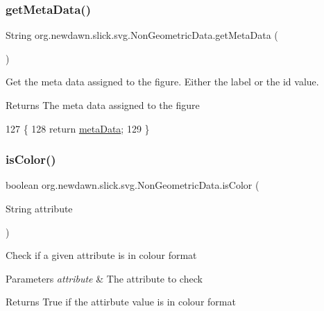 \subsubsection{\texorpdfstring{get\+Meta\+Data()}{getMetaData()}}
{\footnotesize\ttfamily String org.\+newdawn.\+slick.\+svg.\+Non\+Geometric\+Data.\+get\+Meta\+Data (\begin{DoxyParamCaption}{ }\end{DoxyParamCaption})\hspace{0.3cm}{\ttfamily [inline]}}

Get the meta data assigned to the figure. Either the label or the id value.

\begin{DoxyReturn}{Returns}
The meta data assigned to the figure 
\end{DoxyReturn}

\begin{DoxyCode}
127                                 \{
128         \textcolor{keywordflow}{return} \mbox{\hyperlink{classorg_1_1newdawn_1_1slick_1_1svg_1_1_non_geometric_data_ab9720408fbd609767acb6528999a3f8d}{metaData}};
129     \}
\end{DoxyCode}
\mbox{\label{classorg_1_1newdawn_1_1slick_1_1svg_1_1_non_geometric_data_a3712fb62547b297f7d08259682fc2d90}} 
\subsubsection{\texorpdfstring{is\+Color()}{isColor()}}
{\footnotesize\ttfamily boolean org.\+newdawn.\+slick.\+svg.\+Non\+Geometric\+Data.\+is\+Color (\begin{DoxyParamCaption}\item[{String}]{attribute }\end{DoxyParamCaption})\hspace{0.3cm}{\ttfamily [inline]}}

Check if a given attribute is in colour format


\begin{DoxyParams}{Parameters}
{\em attribute} & The attribute to check \\
\hline
\end{DoxyParams}
\begin{DoxyReturn}{Returns}
True if the attirbute value is in colour format 
\end{DoxyReturn}

